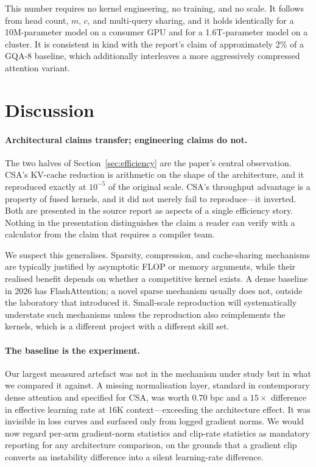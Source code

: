 \documentclass[11pt]{article}
\begin{document}
This number requires no kernel engineering, no training, and no scale. It
follows from head count, $m$, $c$, and multi-query sharing, and it holds
identically for a 10M-parameter model on a consumer GPU and for a 1.6T-parameter
model on a cluster. It is consistent in kind with the report's claim of
approximately 2\% of a GQA-8 baseline, which additionally interleaves a more
aggressively compressed attention variant.

\section{Discussion}

\paragraph{Architectural claims transfer; engineering claims do not.}
The two halves of Section~\ref{sec:efficiency} are the paper's central
observation. CSA's KV-cache reduction is arithmetic on the shape of the
architecture, and it reproduced exactly at $10^{-5}$ of the original scale.
CSA's throughput advantage is a property of fused kernels, and it did not merely
fail to reproduce---it inverted. Both are presented in the source report as
aspects of a single efficiency story. Nothing in the presentation distinguishes
the claim a reader can verify with a calculator from the claim that requires a
compiler team.

We suspect this generalises. Sparsity, compression, and cache-sharing
mechanisms are typically justified by asymptotic FLOP or memory arguments, while
their realised benefit depends on whether a competitive kernel exists. A dense
baseline in 2026 has FlashAttention; a novel sparse mechanism usually does not,
outside the laboratory that introduced it. Small-scale reproduction will
systematically understate such mechanisms unless the reproduction also
reimplements the kernels, which is a different project with a different skill
set.

\paragraph{The baseline is the experiment.}
Our largest measured artefact was not in the mechanism under study but in what
we compared it against. A missing normalisation layer, standard in contemporary
dense attention and specified for CSA, was worth $0.70$ bpc and a
$15\times$ difference in effective learning rate at 16K context---exceeding the
architecture effect. It was invisible in loss curves and surfaced only from
logged gradient norms. We would now regard per-arm gradient-norm statistics and
clip-rate statistics as mandatory reporting for any architecture comparison, on
the grounds that a gradient clip converts an instability difference into a
silent learning-rate difference.
\end{document}
